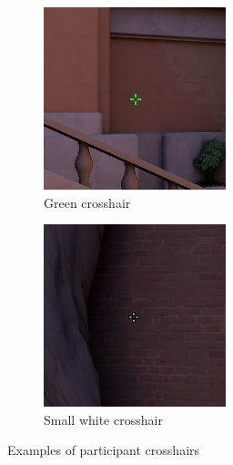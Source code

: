 \documentclass[11pt,manuscript,screen,review]{acmart} %
\begin{document}
\begin{figure}[h]
\begin{subfigure}{0.3\linewidth}
        \includegraphics[width=\linewidth,]{img/tenz-green.png}
        \caption{Green crosshair}
    \end{subfigure}
    \begin{subfigure}{0.3\linewidth}
        \includegraphics[width=\linewidth]{img/tiny.png}
        \caption{Small white crosshair}
    \end{subfigure}
    \caption{Examples of participant crosshairs}
    \label{fig:crosshairs}
\end{figure}
\end{document}

